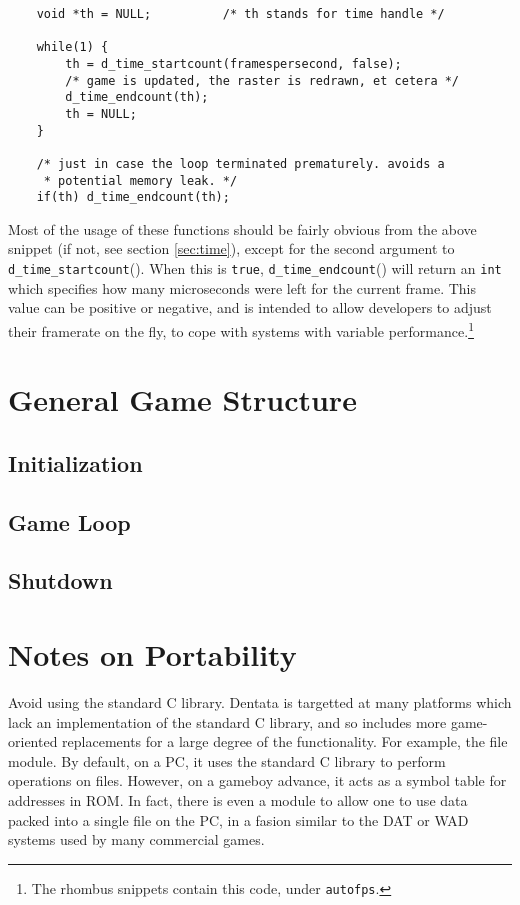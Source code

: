 \begin{verbatim}
    void *th = NULL;          /* th stands for time handle */

    while(1) {
        th = d_time_startcount(framespersecond, false);
        /* game is updated, the raster is redrawn, et cetera */
        d_time_endcount(th);
        th = NULL;
    }

    /* just in case the loop terminated prematurely. avoids a
     * potential memory leak. */
    if(th) d_time_endcount(th);
\end{verbatim}

Most of the usage of these functions should be fairly obvious from
the above snippet (if not, see section \ref{sec:time}), except for
the second argument to {\tt d\_time\_startcount}(). When this is
{\tt true}, {\tt d\_time\_endcount}() will return an {\tt int} which
specifies how many microseconds were left for the current frame.
This value can be positive or negative, and is intended to allow
developers to adjust their framerate on the fly, to cope with systems
with variable performance.\footnote{The rhombus snippets contain this
code, under {\tt autofps}.}

\section{General Game Structure}

\subsection{Initialization}

\subsection{Game Loop}
\subsection{Shutdown}

\section{Notes on Portability}

Avoid using the standard C library. Dentata is targetted at many
platforms which lack an implementation of the standard C library, and
so includes more game-oriented replacements for a large degree of the
functionality. For example, the file module. By default, on a PC, it
uses the standard C library to perform operations on files. However,
on a gameboy advance, it acts as a symbol table for addresses in
ROM. In fact, there is even a module to allow one to use data packed
into a single file on the PC, in a fasion similar to the DAT or
WAD systems used by many commercial games.

